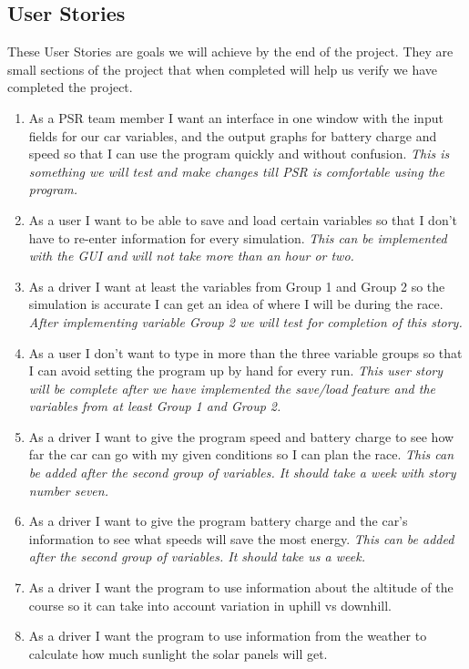 \documentclass[onecolumn, draftclsnofoot,10pt, compsoc]{IEEEtran}
\begin{document}
\begin{singlespace}
    \subsection{User Stories}
    These User Stories are goals we will achieve by the end of the project. They are small sections of the project that when completed will help us verify we have completed the project.
    \begin{enumerate}
        \item As a PSR team member I want an interface in one window with the input fields for our car variables, and the output graphs for battery charge and speed so that I can use the program quickly and without confusion. \textit{This is something we will test and make changes till PSR is comfortable using the program.}
        \item As a user I want to be able to save and load certain variables so that I don't have to re-enter information for every simulation. \textit{This can be implemented with the GUI and will not take more than an hour or two.}
        \item As a driver I want at least the variables from Group 1 and Group 2 so the simulation is accurate I can get an idea of where I will be during the race. \textit{After implementing variable Group 2 we will test for completion of this story.}
        \item As a user I don't want to type in  more than the three variable groups so that I can avoid setting the program up by hand for every run. \textit{This user story will be complete after we have implemented the save/load feature and the variables from at least Group 1 and Group 2.}
        \item As a driver I want to give the program speed and battery charge to see how far the car can go with my given conditions so I can plan the race. \textit{This can be added after the second group of variables. It should take a week with story number seven.}
        \item As a driver I want to give the program battery charge and the car's information to see what speeds will save the most energy. \textit{This can be added after the second group of variables. It should take us a week.}
        \item As a driver I want the program to use information about the altitude of the course so it can take into account variation in uphill vs downhill.
        \item As a driver I want the program to use information from the weather to calculate how much sunlight the solar panels will get.
    \end{enumerate}
    

\end{singlespace}
\end{document}
